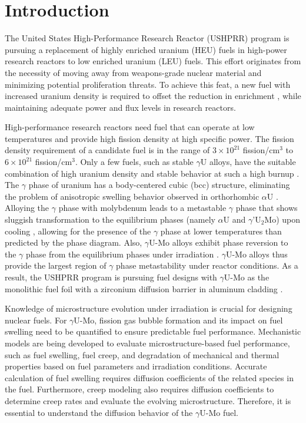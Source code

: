 \documentclass{elsarticle}
\begin{document}
\linenumbers

\section{Introduction}

The United States High-Performance Research Reactor (USHPRR) program is pursuing a replacement of highly enriched uranium (HEU) fuels in high-power research reactors to low enriched uranium (LEU) fuels. This effort originates from the necessity of moving away from weapons-grade nuclear material and minimizing potential proliferation threats. To achieve this feat, a new fuel with increased uranium density is required to offset the reduction in enrichment \cite{snelgrove1997, wilson2020}, while maintaining adequate power and flux levels in research reactors.

High-performance research reactors need fuel that can operate at low temperatures and provide high fission density at high specific power. The fission density requirement of a candidate fuel is in the range of $3 \times 10^{21}$ fission/cm$^3$ to $6 \times 10^{21}$ fission/cm$^3$. Only a few fuels, such as stable $\gamma$U alloys, have the suitable combination of high uranium density and stable behavior at such a high burnup \cite{meyer2014}. The $\gamma$ phase of uranium has a body-centered cubic (bcc) structure, eliminating the problem of anisotropic swelling behavior observed in orthorhombic $\alpha$U \cite{hofman1990, mahbuba2021}. Alloying the $\gamma$ phase with molybdenum leads to a metastable $\gamma$ phase that shows sluggish transformation to the equilibrium phases (namely $\alpha$U and $\gamma$'U$_2$Mo) upon cooling \cite{saller1955, dwight1960}, allowing for the presence of the $\gamma$ phase at lower temperatures than predicted by the phase diagram. Also, $\gamma$U-Mo alloys exhibit phase reversion to the $\gamma$ phase from the equilibrium phases under irradiation \cite{meyer2014, willard1965}. $\gamma$U-Mo alloys thus provide the largest region of $\gamma$ phase metastability under reactor conditions. As a result, the USHPRR program is pursuing fuel designs with $\gamma$U-Mo as the monolithic fuel foil with a zirconium diffusion barrier in aluminum cladding \cite{robinson2009, cole2016, miller2021}.

Knowledge of microstructure evolution under irradiation is crucial for designing nuclear fuels. For $\gamma$U-Mo, fission gas bubble formation and its impact on fuel swelling need to be quantified to ensure predictable fuel performance. Mechanistic models are being developed to evaluate microstructure-based fuel performance, such as fuel swelling, fuel creep, and degradation of mechanical and thermal properties based on fuel parameters and irradiation conditions. Accurate calculation of fuel swelling requires diffusion coefficients of the related species in the fuel. Furthermore, creep modeling also requires diffusion coefficients to determine creep rates and evaluate the evolving microstructure. Therefore, it is essential to understand the diffusion behavior of the $\gamma$U-Mo fuel.
\end{document}
